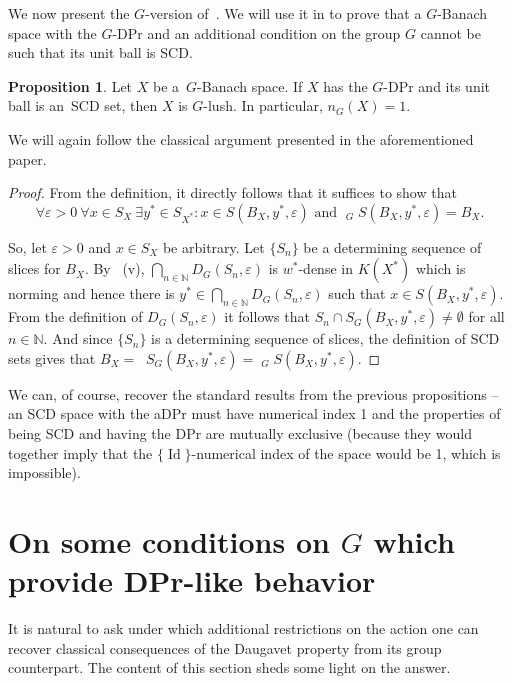 \documentclass[a4paper,12pt]{amsart}
\theoremstyle{definition}
\newtheorem{proposition}[theorem]{Proposition}
\theoremstyle{definition}
\theoremstyle{remark}
\numberwithin{equation}{section}
\newcommand{\N}{\mathbb{N}}
\newcommand{\clco}{\mathop{\overline{\mathrm{co}}}\nolimits}
\DeclareMathOperator{\id}{Id}
\newcommand{\<}{\langle}
\renewcommand{\>}{\rangle}
\newcommand{\e}{\varepsilon}
\newcommand{\eps}{\e}
\begin{document}
	
	We now present the $G$-version of~\cite[Theorem~4.4]{AKMMS}. We will use it in  to prove that a $G$-Banach space with the $G$-DPr and an additional condition on the group $G$ cannot be such that its unit ball is SCD.
	
	
	
	\begin{proposition} \label{G-DPr-G-lush}
		Let $X$ be a~$G$-Banach space. If $X$ has the $G$-DPr and its unit ball is an~SCD set, then $X$ is $G$-lush. In particular, $n_G(X) = 1$.
	\end{proposition}
	We will again follow the classical argument presented in the aforementioned paper.
	\begin{proof}
		From the definition, it directly follows that it suffices to show that
		\begin{equation*}
			\forall \eps > 0 \ \forall x \in S_X \ \exists y^* \in S_{X^*} : x \in S(B_X, y^*, \eps) \text{ and } \clco_G S(B_X, y^*, \eps) = B_X.
		\end{equation*}
		
		So, let $\eps > 0$ and $x \in S_X$ be arbitrary. Let $\{S_n\}$ be a determining sequence of slices for $B_X$. By ~(v), $\bigcap_{n\in\N} D_G(S_n, \eps)$ is $w^*$-dense in $K(X^*)$ which is norming and hence there is $y^* \in \bigcap_{n\in\N} D_G(S_n, \eps)$ such that $x \in S(B_X, y^*, \eps)$. From the definition of $D_G(S_n, \eps)$ it follows that $S_n \cap S_G(B_X, y^*, \eps) \neq \emptyset$ for all $n \in \N$. And since $\{S_n\}$ is a determining sequence of slices, the definition of SCD sets gives that $B_X = \clco S_G(B_X, y^*, \eps) = \clco_G S(B_X, y^*, \eps)$.
	\end{proof}
	
	We can, of course, recover the standard results from the previous propositions -- an SCD space with the aDPr must have numerical index 1 and the properties of being SCD and having the DPr are mutually exclusive (because they would together imply that the $\{\id\}$-numerical index of the space would be 1, which is impossible).
	
	\section{On some conditions on $G$ which provide DPr-like behavior} 
	
	
	It is natural to ask under which additional restrictions on the action one can recover classical consequences of the Daugavet property from its group counterpart. The content of this section sheds some light on the answer.
	
\end{document}
